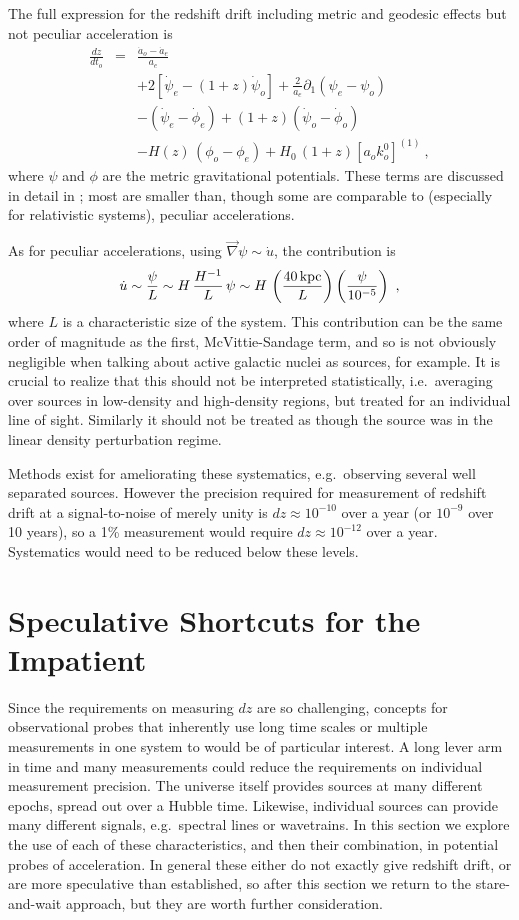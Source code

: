 \documentclass[preprint2, 10pt]{aastex}
\newcommand{\be}{\begin{equation}}
\newcommand{\ee}{\end{equation}}
\newcommand{\bea}{\begin{eqnarray}}
\newcommand{\eea}{\end{eqnarray}}
\begin{document}
The full expression for the redshift drift including metric and geodesic 
effects but not peculiar acceleration is 
\bea 
\frac{dz}{dt_o}&=&\frac{\dot a_o-\dot a_e}{a_e}\\ 
&&+2[\dot\psi_e-(1+z)\dot\psi_o]
+\frac{2}{a_e}\partial_1(\psi_e-\psi_o)\nonumber\\ 
&&-(\dot\psi_e-\dot\phi_e)+(1+z)(\dot\psi_o-\dot\phi_o)\nonumber\\ 
&&-H(z)\,(\phi_o-\phi_e)+H_0\,(1+z)[a_o k^0_o]^{(1)}\ ,\nonumber  
\eea 
where $\psi$ and $\phi$ are the metric gravitational potentials. 
These terms are discussed in detail in \citet{10044646}; most are smaller 
than, though some are comparable to (especially for relativistic systems), 
peculiar accelerations. 

As for peculiar accelerations, using 
$\vec\nabla\psi\sim \dot u$, the contribution is 
\be 
\dot u \sim \frac{\psi}{L}\sim H\,\frac{H^{-1}}{L}\,\psi\sim H\, 
\left(\frac{40\,{\rm kpc}}{L}\right)\left(\frac{\psi}{10^{-5}}\right)\ , 
\ee 
where $L$ is a characteristic size of the system.  This contribution can be 
the same order of magnitude as the first, McVittie-Sandage term, and so is 
not obviously negligible when talking about active galactic nuclei as 
sources, for example. It is crucial to realize that this should not be 
interpreted statistically, i.e.\ averaging over sources in low-density 
and high-density regions, but treated for an individual line of sight. 
Similarly it should not be treated as though the source was in the linear 
density perturbation regime. 

Methods exist for ameliorating these systematics, e.g.\ observing several 
well separated sources.  However the precision required for measurement of 
redshift drift at a signal-to-noise of merely unity is 
$dz\approx 10^{-10}$ over a year (or $10^{-9}$ over 10 years), 
so a 1\% measurement would require $dz\approx 10^{-12}$ over a year.  
Systematics would need to be reduced below these levels. 


\section{Speculative Shortcuts for the Impatient} \label{sec:methods} 

Since the requirements on measuring $dz$ are so challenging, 
concepts for observational probes that inherently use long time scales or 
multiple measurements in one system to  would be of particular interest. 
A long lever arm in time and many measurements could reduce the requirements 
on individual measurement precision.  The universe itself provides sources 
at many different epochs, spread out over a Hubble time.  Likewise, 
individual sources can provide many different signals, e.g.\ spectral lines 
or wavetrains.  In this section we explore the use of each of these 
characteristics, and then their combination, in potential probes of 
acceleration. In general these either do not exactly give redshift drift, 
or are more speculative than established, so after this section we return 
to the stare-and-wait approach, but they are worth further consideration. 
\end{document}
